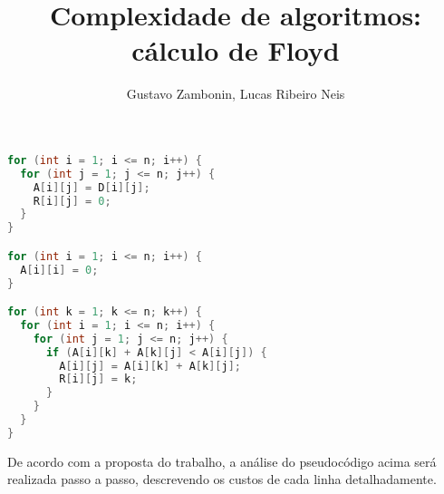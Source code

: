 \documentclass{sftex/sftex}
\title{Complexidade de algoritmos: cálculo de Floyd}
\author{Gustavo Zambonin, Lucas Ribeiro Neis}
\begin{document}
\maketitle

\begin{lstlisting}[language=C++]
for (int i = 1; i <= n; i++) {
  for (int j = 1; j <= n; j++) {
    A[i][j] = D[i][j];
    R[i][j] = 0;
  }
}

for (int i = 1; i <= n; i++) {
  A[i][i] = 0;
}

for (int k = 1; k <= n; k++) {
  for (int i = 1; i <= n; i++) {
    for (int j = 1; j <= n; j++) {
      if (A[i][k] + A[k][j] < A[i][j]) {
        A[i][j] = A[i][k] + A[k][j];
        R[i][j] = k;
      }
    }
  }
}
\end{lstlisting}

De acordo com a proposta do trabalho, a análise do pseudocódigo acima será
realizada passo a passo, descrevendo os custos de cada linha detalhadamente.
\end{document}
